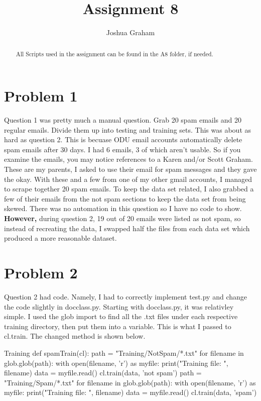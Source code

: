 \documentclass[11pt]{report}
\begin{document}
\title{Assignment 8}
\author{Joshua Graham}

\maketitle
\pagebreak
\begin{abstract}
All Scripts used in the assignment can be found in the A8 folder, if needed.

\end{abstract}
\section{Problem 1}
	Question 1 was pretty much a manual question. Grab 20 spam emails and 20 regular emails. Divide them up into testing and training sets. This was about as hard as question 2. This is becuase ODU email accounts automatically delete spam emails after 30 days. I had 6 emails, 3 of which aren't usable. So if you examine the emails, you may notice references to a Karen and/or Scott Graham. These are my parents, I asked to use their email for spam messages and they gave the okay. With these and a few from one of my other gmail accounts, I managed to scrape together 20 spam emails. To keep the data set related, I also grabbed a few of their emails from the not spam sections to keep the data set from being skewed. There was no automation in this question so I have no code to show. \textbf{However,} during question 2, 19 out of 20 emails were listed as not spam, so instead of recreating the data, I swapped half the files from each data set which produced a more reasonable dataset.
\pagebreak
\section{Problem 2}
	Question 2 had code. Namely, I had to correctly implement test.py and change the code slightly in docclass.py. Starting with docclass.py, it was relativley simple. I used the glob import to find all the .txt files under each respective training directory, then put them into a variable. This is what I passed to cl.train. The changed method is shown below. 
\begin{mylisting}{Training}
def spamTrain(cl):
    path = "Training/NotSpam/*.txt"
    for filename in glob.glob(path):
        with open(filename, 'r') as myfile:
            print("Training file: ", filename)
            data = myfile.read()
            cl.train(data, 'not spam')
    path = "Training/Spam/*.txt"
    for filename in glob.glob(path):
        with open(filename, 'r') as myfile:
            print("Training file: ", filename)
            data = myfile.read()
            cl.train(data, 'spam')
\end{mylisting}
\end{document}
